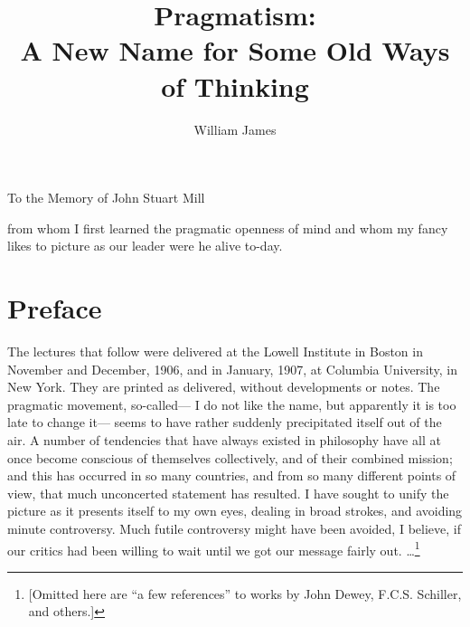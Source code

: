 \documentclass[]{article}
\begin{document}

\title{Pragmatism:\\ A New Name for Some Old Ways of Thinking}
\author{William James}
\date{}
\maketitle


\begin{center}
To the Memory of John Stuart Mill

from whom I first learned the pragmatic openness of mind and whom my
fancy likes to picture as our leader were he alive to-day.
\end{center}



\section*{Preface}

The lectures that follow were delivered at the Lowell Institute in
Boston in November and December, 1906, and in January, 1907, at
Columbia University, in New York. They are printed as delivered, without
developments or notes. The pragmatic movement, so-called--- I do not like
the name, but apparently it is too late to change it--- seems to have
rather suddenly precipitated itself out of the air. A number of
tendencies that have always existed in philosophy have all at once
become conscious of themselves collectively, and of their combined
mission; and this has occurred in so many countries, and from so many
different points of view, that much unconcerted statement has resulted.
I have sought to unify the picture as it presents itself to my own eyes,
dealing in broad strokes, and avoiding minute controversy. Much futile
controversy might have been avoided, I believe, if our critics had been
willing to wait until we got our message fairly out.
\ldots\footnote{[Omitted here are ``a few references'' to works by John Dewey, F.C.S. Schiller, and others.]}

\medskip

\end{document}
